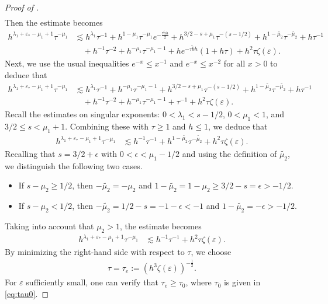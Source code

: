 ﻿\documentclass[11pt,reqno,oneside]{amsart}
\theoremstyle{definition}
\theoremstyle{remark}
\newcommand{\e}{\varepsilon}
\newcommand{\lm}{\lambda}
\begin{document}
\begin{proof}[Proof of ]
\begin{align*}
            \end{align*}
            Then the estimate becomes
            \begin{align*}
                h^{\lm_1+\e_*-\mu_1+1} \tau^{-\mu_1} &\lesssim h^{\lm_1}\tau^{-1} + h^{1-\mu_1}\tau^{-\mu_1} e^{-\frac{\tau \widetilde{a} h}{2}} + h^{3/2-s+\mu_1} \tau^{-(s-1/2)} + h^{1-\widetilde{\mu_2}}\tau^{-\widetilde{\mu_2}} + h\tau^{-1}\\
                & \quad + h^{-1}\tau^{-2}+h^{-\mu_1}\tau^{-\mu_1-1}+h e^{-\tau \widetilde{b} h} (1+h\tau) +h^2 \tau \zeta(\e).
            \end{align*}
            Next, we use the usual inequalities $e^{-x}\leq x^{-1}$ and $e^{-x}\leq x^{-2}$ for all $x>0$ to deduce that
            \begin{align*}
                h^{\lm_1+\e_*-\mu_1+1} \tau^{-\mu_1} &\lesssim h^{\lm_1}\tau^{-1} + h^{-\mu_1}\tau^{-\mu_1-1} + h^{3/2-s+\mu_1} \tau^{-(s-1/2)} + h^{1-\widetilde{\mu_2}}\tau^{-\widetilde{\mu_2}} + h\tau^{-1}\\
                & \quad + h^{-1}\tau^{-2}+h^{-\mu_1}\tau^{-\mu_1-1}+\tau^{-1} +h^2 \tau \zeta(\e).
            \end{align*}
            Recall the estimates on singular exponents: $0<\lm_1<s-1/2$, $0<\mu_1<1$, and $3/2\leq s <\mu_1+1$. Combining these with $\tau\geq 1$ and $h\leq 1$, we deduce that
            \begin{align*}
                h^{\lm_1+\e_*-\mu_1+1} \tau^{-\mu_1} &\lesssim h^{-1}\tau^{-1}+  h^{1-\widetilde{\mu_2}}\tau^{-\widetilde{\mu_2}}+h^2 \tau \zeta(\e).
            \end{align*}
            Recalling that $s=3/2+\epsilon$ with $0<\epsilon<\mu_1-1/2$ and using the definition of $\widetilde{\mu_2}$, we distinguish the following two cases.
            \begin{itemize}
                \item If $s-\mu_2\geq 1/2$, then $-\widetilde{\mu_2}=-\mu_2$ and $1-\widetilde{\mu_2}=1-\mu_2\geq 3/2-s=\epsilon>-1/2$.
                \item If $s-\mu_2< 1/2$, then $-\widetilde{\mu_2}=1/2-s=-1-\epsilon <-1$ and $1-\widetilde{\mu_2}=-\epsilon >-1/2$.
            \end{itemize}
            Taking into account that $\mu_2>1$, the estimate becomes
            \begin{align*}
                h^{\lm_1+\e_*-\mu_1+1} \tau^{-\mu_1} &\lesssim h^{-1}\tau^{-1}+h^2 \tau \zeta(\e).
            \end{align*}
            By minimizing the right-hand side with respect to $\tau$, we choose
            \begin{align}
                \tau=\tau_e:=\left(h^3\zeta(\e)\right)^{-\frac{1}{2}}.
            \end{align}
            For $\e$ sufficiently small, one can verify that $\tau_e\geq \tau_0$, where $\tau_0$ is given in \eqref{eq:tau0}.


\end{proof}
\end{document}
